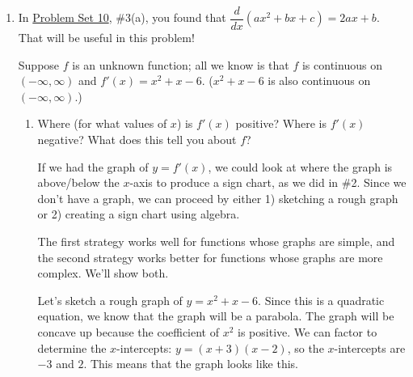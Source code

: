 \documentclass{article}
\begin{document}
\begin{enumerate}
  \begin{solution}
    If $f$ and $g$ always have the same continuous derivative,
    then the graphs of $f(t)$ and $g(t)$ will be vertical shifts of each other. That is, $g(t) = f(t) + c$. Another
    way to say this is that $f(t)$ and $g(t)$ differ by a constant.
  \end{solution}

\item  


  In \href{https://people.math.harvard.edu/~jjchen/mathma/docs/homework/PS10.html}{Problem Set 10}, {{{{\#3}}(a)}}, you found that $\dfrac{d}{dx}(ax^2 + bx + c) = 2ax + b$. That will be useful in this problem!

  Suppose $f$ is an unknown function; all we know is that $f$ is continuous on $(-\infty, \infty)$ and $f'(x) = x^2 + x - 6$. ($x^2 + x - 6$ is also continuous on $(-\infty, \infty)$.)

  \begin{enumerate}
  \item


    \begin{problem}[\vfill]
      Where (for what values of $x$) is $f'(x)$ positive?
      Where is $f'(x)$ negative? What does this tell you about $f$?
    \end{problem}

    \begin{solution}
      If we had the graph of $y=f'(x)$, we could look at where the graph is above/below the $x$-axis
      to produce a sign chart, as we did in \#2. Since we don't have a graph, we can proceed by either
      1) sketching a rough graph or 2) creating a sign chart using algebra. 
      
      The first strategy
      works well for functions whose graphs are simple, 
      and the second strategy works better for functions whose graphs are more complex.
      We'll show both.

      Let's sketch a rough graph of $y=x^2+x-6$. Since this is a quadratic equation, we know that the graph
      will be a parabola. The graph will be concave up because the coefficient of $x^2$ is positive. We can
      factor to determine the $x$-intercepts: $y=(x+3)(x-2)$, so the $x$-intercepts are $-3$ and $2$.
      This means that the graph looks like this.


\end{solution}
\end{enumerate}
\end{enumerate}
\end{document}
